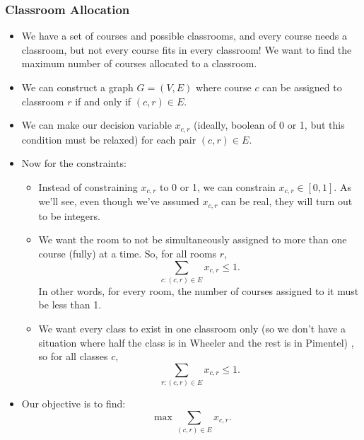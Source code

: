 \subsubsection{Classroom Allocation}
\begin{itemize}
	\item We have a set of courses and possible classrooms, and every course needs a classroom, but not 
		every course fits in every classroom! We want to find the maximum number of courses allocated 
		to a classroom.
	\item We can construct a graph $G = (V, E)$ where course $c$ can be assigned to classroom $r$ if and 
		only if $(c, r) \in E$. 
	\item We can make our decision variable \( x_{c, r} \)
		(ideally, boolean of 0 or 1, but this condition must be
		relaxed) for each pair $(c, r) \in E$. 
	\item Now for the constraints:
		\begin{itemize}
		\item Instead of constraining $x_{c, r}$ to 0 or 1, we can constrain $x_{c, r} \in [0, 1]$. As we'll 
			see, even though we've assumed $x_{c, r}$ can be real, they will turn out to be integers.
		\item We want the room to not be simultaneously assigned to more than one course (fully) at a time. So, 
			for all rooms $r$,
			\[
				\sum_{c:(c, r) \in E} x_{c, r} \le 1
			.\]
			In other words, for every room, the number of courses assigned to it must be less than 1. 
		\item We want every class to exist in one classroom only (so we don't have a situation 
			where half the class is in Wheeler and the rest is in Pimentel) , so for all classes $c$, 
			\[
				\sum_{r: (c, r) \in E} x_{c, r} \le 1
			.\]

		\end{itemize}
	\item Our objective is to find:
		\[
			\max \sum_{(c, r) \in E} x_{c, r}
		.\]
\end{itemize}

